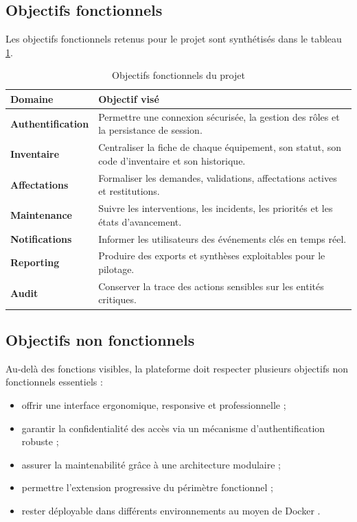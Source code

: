 \subsection{Objectifs fonctionnels}
Les objectifs fonctionnels retenus pour le projet sont synthétisés dans le tableau \ref{tab:objectifs-fonctionnels}.

\begin{table}[H]
\centering
\caption{Objectifs fonctionnels du projet}
\label{tab:objectifs-fonctionnels}
\begin{tabularx}{\textwidth}{>{\bfseries}p{3.4cm}X}
\toprule
Domaine & Objectif visé \\
\midrule
Authentification & Permettre une connexion sécurisée, la gestion des rôles et la persistance de session. \\
Inventaire & Centraliser la fiche de chaque équipement, son statut, son code d'inventaire et son historique. \\
Affectations & Formaliser les demandes, validations, affectations actives et restitutions. \\
Maintenance & Suivre les interventions, les incidents, les priorités et les états d'avancement. \\
Notifications & Informer les utilisateurs des événements clés en temps réel. \\
Reporting & Produire des exports et synthèses exploitables pour le pilotage. \\
Audit & Conserver la trace des actions sensibles sur les entités critiques. \\
\bottomrule
\end{tabularx}
\end{table}

\subsection{Objectifs non fonctionnels}
Au-delà des fonctions visibles, la plateforme doit respecter plusieurs objectifs non fonctionnels essentiels :
\begin{itemize}
  \item offrir une interface ergonomique, responsive et professionnelle ;
  \item garantir la confidentialité des accès via un mécanisme d'authentification robuste ;
  \item assurer la maintenabilité grâce à une architecture modulaire ;
  \item permettre l'extension progressive du périmètre fonctionnel ;
  \item rester déployable dans différents environnements au moyen de Docker \cite{merkel2014docker,dockerdocs}.
\end{itemize}

